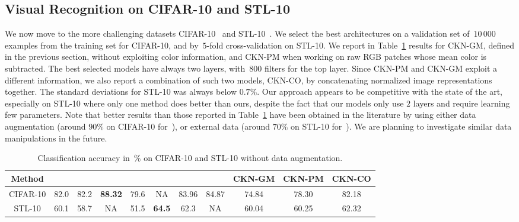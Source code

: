 \subsection{Visual Recognition on CIFAR-10 and STL-10}
We now move to the more challenging datasets
CIFAR-10~\cite{krizhevsky2009} and STL-10~\cite{coates2011}. We select the
best architectures on a validation set of~$10\,000$ examples from the training
set for CIFAR-10, and by~$5$-fold cross-validation on STL-10. We report in Table~\ref{table:cifar} results for CKN-GM,
defined in the previous section, without exploiting color information, and
CKN-PM when working on raw RGB patches whose
mean color is subtracted. The best selected models have always two layers,
with~$800$ filters for the top layer.  Since CKN-PM and CKN-GM exploit a
different information, we also report a combination of such two models, CKN-CO,
by concatenating normalized image representations together. The standard deviations
for STL-10 was always below $0.7\%$.
Our approach appears to be competitive with the state of the
art, especially on STL-10 where only one method does better than ours, despite
the fact that our models only use $2$ layers and require learning few
parameters.
Note that better results than those reported in Table~\ref{table:cifar} have
been obtained in the literature by using either data augmentation (around
$90\%$ on CIFAR-10 for~\cite{goodfellow2013,wan2013}), or external data (around
$70\%$ on STL-10 for~\cite{swersky2013}). We are planning to investigate similar data manipulations
in the future.

\begin{table}[hbtp]
   \centering
   \footnotesize
   \renewcommand\tabcolsep{0.19cm}
   \begin{tabular}{|c||c|c|c|c|c|c|c||c|c|c|}
      \hline
      Method & \cite{coates2011b} & \cite{sohn2012} & \cite{goodfellow2013} & \cite{coates2011} & \cite{bo2013} & \cite{gens2012} & \cite{zeiler2013} & CKN-GM & CKN-PM & CKN-CO\\
      \hline
      CIFAR-10  & 82.0 & 82.2 & \textbf{88.32} & 79.6 & NA   & 83.96 & 84.87& 74.84 & 78.30 & 82.18\\
      \hline
      STL-10  & 60.1 & 58.7 & NA    & 51.5 & \textbf{64.5} & 62.3 & NA& 60.04 & 60.25  & 62.32\\
      \hline
   \end{tabular}
   \vsb
   \caption{Classification accuracy in~$\%$ on CIFAR-10 and STL-10 without data augmentation.}\label{table:cifar}
\end{table}

\vsb
